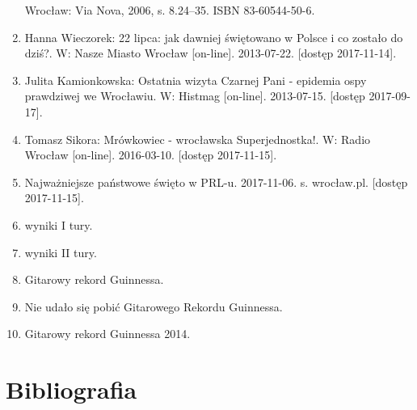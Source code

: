 \documentclass{article}
\begin{document}
\begin{enumerate}
 Wrocław: Via Nova, 2006, s. 8.24–35. ISBN 83-60544-50-6.\label{fig: [24]}
 \item Hanna Wieczorek: 22 lipca: jak dawniej świętowano w Polsce i co zostało do dziś?. W: Nasze Miasto Wrocław [on-line]. 2013-07-22. [dostęp 2017-11-14].\label{fig: [25]}
\item Julita Kamionkowska: Ostatnia wizyta Czarnej Pani - epidemia ospy prawdziwej we Wrocławiu. W: Histmag [on-line]. 2013-07-15. [dostęp 2017-09-17].\label{fig: [26]}
\item Tomasz Sikora: Mrówkowiec - wrocławska Superjednostka!. W: Radio Wrocław [on-line]. 2016-03-10. [dostęp 2017-11-15].\label{fig: [27]}
\item Najważniejsze państwowe święto w PRL-u. 2017-11-06. s. wrocław.pl. [dostęp 2017-11-15].\label{fig: [28]}
\item wyniki I tury.\label{fig: [29]}
\item wyniki II tury.\label{fig: [30]}
\item Gitarowy rekord Guinnessa.\label{fig: [31]}
\item Nie udało się pobić Gitarowego Rekordu Guinnessa.\label{fig: [32]}
\item Gitarowy rekord Guinnessa 2014.\label{fig: [33]}
\end{enumerate}
 
 
\section {Bibliografia}
\end{document}
